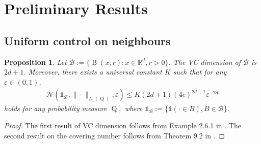 \documentclass[10pt]{article}
\newcommand{\eps}{\varepsilon}
\newcommand{\mB}{\mathcal{B}}
\newcommand{\RR}{\mathbb{R}}
\newcommand{\B}{\operatorname{B}}
\newcommand{\Q}{\operatorname{Q}}
\newtheorem{proposition}[theorem]{Proposition}
\begin{document}
\section{Preliminary Results} 
\label{app.prelim}

\subsection{Uniform control on neighbours}

\begin{proposition}\label{prop.covering.number}
Let $\mB := \{\B(x, r) : x \in \RR^d, r > 0 \}$. 
The VC dimension of  $\mB$ is $2d + 1$. 
Moreover, there exists a universal constant $K$ such that for any $\eps \in (0, 1)$, 
\begin{align*}
\mathcal{N}(\mathds{1}_{\mB}, \|\cdot\|_{L_1(\Q)}, \eps)
\leq K (2d+1) (4e)^{2d+1} \eps^{-2d}
\end{align*}
holds for any probability measure $\Q,$ where $\mathds{1}_{\mB} := \{\mathds{1}(\cdot \in B), B \in \mB\}.$
\end{proposition}

\begin{proof}
The first result of VC dimension follows from Example 2.6.1 in \cite{MR1385671}. The second result on the covering number follows from Theorem 9.2 in \cite{MR2724368}.
\end{proof}
\end{document}
